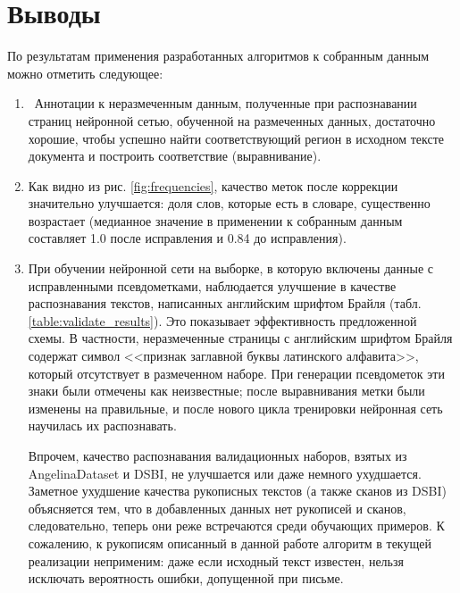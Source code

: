 \documentclass{main.tex}[subfiles]
\begin{document}
\newpage
\section{Выводы}

По результатам применения разработанных алгоритмов к собранным данным можно отметить следующее:
\begin{enumerate}[noitemsep]
	\item  Аннотации к неразмеченным данным, полученные при распознавании страниц нейронной сетью, обученной на размеченных данных, достаточно хорошие, чтобы успешно найти соответствующий регион в исходном тексте документа и построить соответствие (выравнивание).
	\item Как видно из рис. \ref{fig:frequencies}, качество меток после коррекции значительно улучшается: доля слов, которые есть в словаре, существенно возрастает (медианное значение в применении к собранным данным составляет 1.0 после исправления и 0.84 до исправления).
	\item При обучении нейронной сети на выборке, в которую включены данные с исправленными псевдометками, наблюдается улучшение в качестве распознавания текстов, написанных английским шрифтом Брайля (табл. \ref{table:validate_results}).
	Это показывает эффективность предложенной схемы.
	В частности, неразмеченные страницы с английским шрифтом Брайля содержат символ <<признак заглавной буквы латинского алфавита>>, который отсутствует в размеченном наборе.
	При генерации псевдометок эти знаки были отмечены как неизвестные; после выравнивания метки были изменены на правильные, и после нового цикла тренировки нейронная сеть научилась их распознавать.

	Впрочем, качество распознавания валидационных наборов, взятых из AngelinaDataset и DSBI, не улучшается или даже немного ухудшается.
	Заметное ухудшение качества рукописных текстов (а также сканов из DSBI) объясняется тем, что в добавленных данных нет рукописей и сканов, следовательно, теперь они реже встречаются среди обучающих примеров.
	К сожалению, к рукописям описанный в данной работе алгоритм в текущей реализации неприменим: даже если исходный текст известен, нельзя исключать вероятность ошибки, допущенной при письме.
\end{enumerate}
\end{document}
